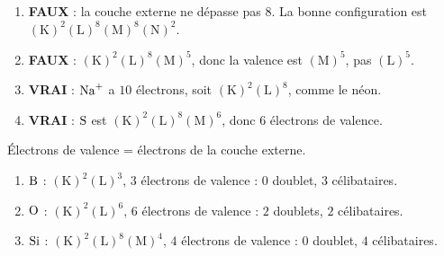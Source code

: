 \documentclass[11pt,a4paper]{article}
\begin{document}
\begin{corrige}
\begin{enumerate}[label=\alph*)]
  \item \textbf{\textcolor{attncol}{FAUX}} : la couche externe ne dépasse pas $8$. La bonne
        configuration est $(\mathrm{K})^2(\mathrm{L})^8(\mathrm{M})^8(\mathrm{N})^2$.
  \item \textbf{\textcolor{attncol}{FAUX}} : $(\mathrm{K})^2(\mathrm{L})^8(\mathrm{M})^5$, donc la
        valence est $(\mathrm{M})^5$, pas $(\mathrm{L})^5$.
  \item \textbf{\textcolor{excol}{VRAI}} : $\ce{Na^{+}}$ a $10$ électrons, soit
        $(\mathrm{K})^2(\mathrm{L})^8$, comme le néon.
  \item \textbf{\textcolor{excol}{VRAI}} : $\ce{S}$ est $(\mathrm{K})^2(\mathrm{L})^8(\mathrm{M})^6$,
        donc $6$ électrons de valence.
\end{enumerate}
\end{corrige}

\begin{corrige}
Électrons de valence = électrons de la couche externe.
\begin{enumerate}[label=\alph*)]
  \item $\ce{B}$ : $(\mathrm{K})^2(\mathrm{L})^3$, $3$ électrons de valence : $0$ doublet, $3$ célibataires.
  \item $\ce{O}$ : $(\mathrm{K})^2(\mathrm{L})^6$, $6$ électrons de valence : $2$ doublets, $2$ célibataires.
  \item $\ce{Si}$ : $(\mathrm{K})^2(\mathrm{L})^8(\mathrm{M})^4$, $4$ électrons de valence : $0$ doublet,
        $4$ célibataires.
\end{enumerate}
\end{corrige}
\end{document}
